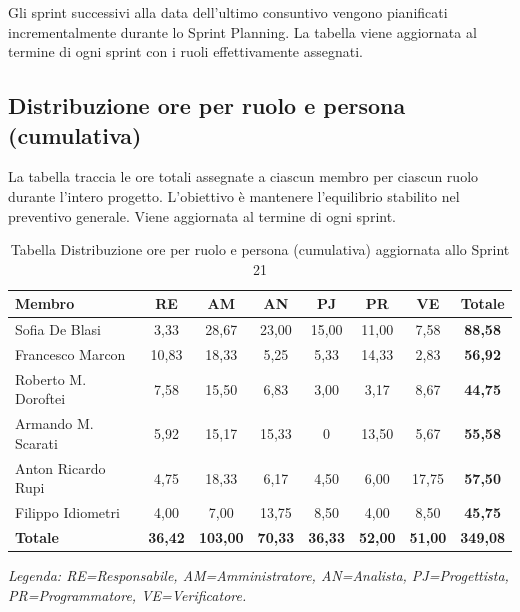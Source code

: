 Gli sprint successivi alla data dell'ultimo consuntivo vengono pianificati
incrementalmente durante lo Sprint Planning. La tabella viene aggiornata al
termine di ogni sprint con i ruoli effettivamente assegnati.

\subsection{Distribuzione ore per ruolo e persona (cumulativa)}
La tabella traccia le ore totali assegnate a ciascun membro per ciascun ruolo durante
l'intero progetto. L'obiettivo è mantenere l'equilibrio stabilito nel preventivo
generale. Viene aggiornata al termine di ogni sprint.

\begin{table}[H]
    \centering
    \renewcommand{\arraystretch}{1.3}
    \begin{tabularx}{\textwidth}{|X|c|c|c|c|c|c|c|}
        \hline
        \textbf{Membro} & \textbf{RE} & \textbf{AM} & \textbf{AN} &
        \textbf{PJ} & \textbf{PR} & \textbf{VE} & \textbf{Totale} \\
        \hline
        Sofia De Blasi       & 3,33 & 28,67 & 23,00 & 15,00    & 11,00    & 7,58 & \textbf{88,58} \\
        \hline
        Francesco Marcon     & 10,83 & 18,33 & 5,25  & 5,33 & 14,33 & 2,83 & \textbf{56,92} \\
        \hline
        Roberto M. Doroftei  & 7,58 & 15,50 & 6,83  & 3,00    & 3,17    & 8,67 & \textbf{44,75} \\
        \hline
        Armando M. Scarati   & 5,92 & 15,17 & 15,33 & 0    & 13,50    & 5,67    & \textbf{55,58} \\
        \hline
        Anton Ricardo Rupi   & 4,75 & 18,33 & 6,17  & 4,50    & 6,00    & 17,75 & \textbf{57,50} \\
        \hline
        Filippo Idiometri    & 4,00 & 7,00  & 13,75 & 8,50    & 4,00    & 8,50 & \textbf{45,75} \\
        \hline
        \textbf{Totale}      & \textbf{36,42} & \textbf{103,00} & \textbf{70,33} & \textbf{36,33} & \textbf{52,00} & \textbf{51,00} & \textbf{349,08} \\
        \hline
    \end{tabularx}
    \begin{minipage}{\textwidth}
        \smallskip
        \footnotesize\textit{Legenda: RE=Responsabile, AM=Amministratore,
        AN=Analista, PJ=Progettista, PR=Programmatore, VE=Verificatore.}
    \end{minipage}
    \caption{Tabella Distribuzione ore per ruolo e persona (cumulativa) aggiornata allo Sprint 21}
\end{table}

